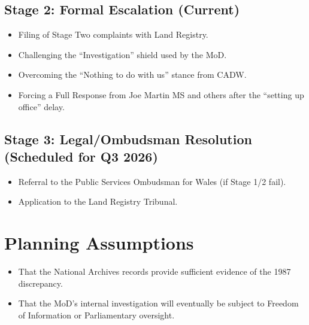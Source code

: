 \documentclass[letterpaper,10pt,openany,oneside,english]{sphinxmanual}
\begin{document}
\subsection{Stage 2: Formal Escalation (Current)}
\label{\detokenize{plan:stage-2-formal-escalation-current}}\begin{itemize}
\item {} 
\sphinxAtStartPar
Filing of Stage Two complaints with Land Registry.

\item {} 
\sphinxAtStartPar
Challenging the “Investigation” shield used by the MoD.

\item {} 
\sphinxAtStartPar
Overcoming the “Nothing to do with us” stance from CADW.

\item {} 
\sphinxAtStartPar
Forcing a Full Response from Joe Martin MS and others after the “setting up office” delay.

\end{itemize}


\subsection{Stage 3: Legal/Ombudsman Resolution (Scheduled for Q3 2026)}
\label{\detokenize{plan:stage-3-legal-ombudsman-resolution-scheduled-for-q3-2026}}\begin{itemize}
\item {} 
\sphinxAtStartPar
Referral to the Public Services Ombudsman for Wales (if Stage 1/2 fail).

\item {} 
\sphinxAtStartPar
Application to the Land Registry Tribunal.

\end{itemize}


\section{Planning Assumptions}
\label{\detokenize{plan:planning-assumptions}}\begin{itemize}
\item {} 
\sphinxAtStartPar
That the National Archives records provide sufficient evidence of the 1987 discrepancy.

\item {} 
\sphinxAtStartPar
That the MoD’s internal investigation will eventually be subject to Freedom of Information or Parliamentary oversight.

\end{itemize}
\end{document}
